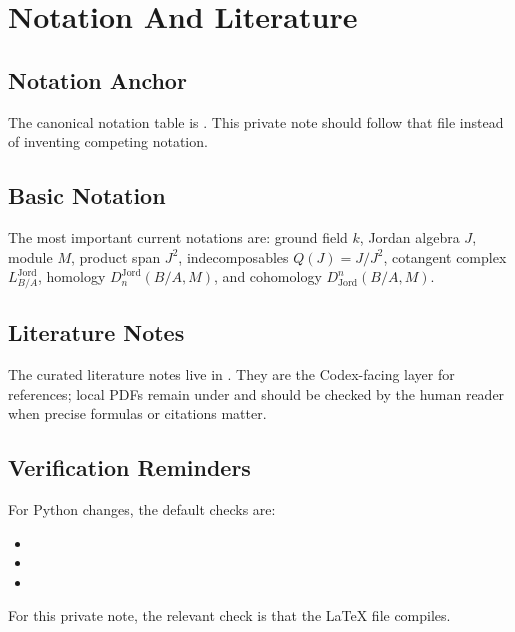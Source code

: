 \chapter{Notation And Literature}

\section{Notation Anchor}

The canonical notation table is . This private
note should follow that file instead of inventing competing notation.

\section{Basic Notation}

The most important current notations are: ground field \(k\), Jordan algebra
\(J\), module \(M\), product span \(J^2\), indecomposables \(Q(J)=J/J^2\),
cotangent complex \(L^{\mathrm{Jord}}_{B/A}\), homology
\(D_n^{\mathrm{Jord}}(B/A,M)\), and cohomology
\(D^n_{\mathrm{Jord}}(B/A,M)\).

\section{Literature Notes}

The curated literature notes live in . They are the
Codex-facing layer for references; local PDFs remain under
 and should be checked by the human reader when
precise formulas or citations matter.

\section{Verification Reminders}

For Python changes, the default checks are:
\begin{itemize}
  \item {}
  \item {}
  \item {}
\end{itemize}
For this private note, the relevant check is that the LaTeX file compiles.
